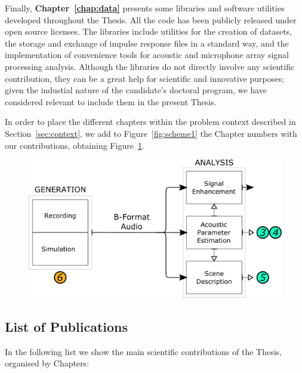Finally, \textbf{Chapter~\ref{chap:data}} presents some libraries and software utilities developed throughout the Thesis. All the code has been publicly released under open source licenses. The libraries include utilities for the creation of datasets, the storage and exchange of impulse response files in a standard way, and the implementation of convenience tools for acoustic and microphone array signal processing analysis. Although the libraries do not directly involve any scientific contribution, they can be a great help for scientific and innovative purposes; given the industial nature of the candidate's doctoral program, we have considered relevant to include them in the present Thesis. 

In order to place the different chapters within the problem context described in Section~\ref{sec:context}, we add to Figure~\ref{fig:scheme1} the Chapter numbers with our contributions, obtaining Figure~\ref{fig:scheme1_numbers}.


\begin{figure}[hbt]
  \includegraphics[width=\textwidth]{Figures/Introduction/SCHEME1_NUMBERS.png}
  \caption{}
  \label{fig:scheme1_numbers}
\end{figure}

\subsection{List of Publications}

In the following list we show the main scientific contributions of the Thesis, organised by Chapters:


